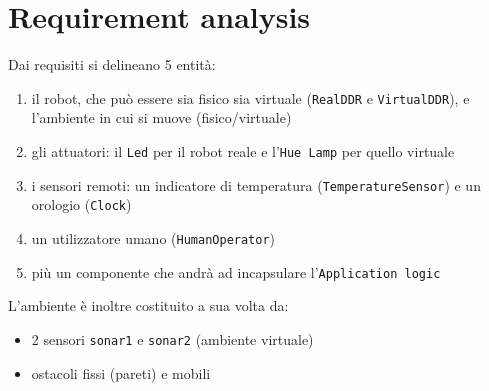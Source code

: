 \documentclass{../llncs}
\newcommand{\code}[1]{{\color{blue}\small{\texttt{#1}}}}
\newcommand{\labelsec}[1]{\label{sec:#1}}
\begin{document}
%

\section{Requirement analysis}
\labelsec{ReqAnalysis}

Dai requisiti si delineano 5 entità:
\begin{enumerate}
\item il robot, che può essere sia fisico sia virtuale (\texttt{RealDDR} e \texttt{VirtualDDR}), e l'ambiente in cui si muove (fisico/virtuale)
\item gli attuatori: il \texttt{Led} per il robot reale e l'\texttt{Hue Lamp} per quello virtuale
\item i sensori remoti: un indicatore di temperatura (\texttt{TemperatureSensor}) e un orologio (\texttt{Clock})
\item un utilizzatore umano (\texttt{HumanOperator})
\item più un componente che andrà ad incapsulare l'\texttt{Application logic}
\end{enumerate}

\noindent L'ambiente è inoltre costituito a sua volta da:
\begin{itemize}[label={--}]
\item 2 sensori \code{sonar1} e \code{sonar2} (ambiente virtuale)
\item ostacoli fissi (pareti) e mobili
\end{itemize}
\end{document}
